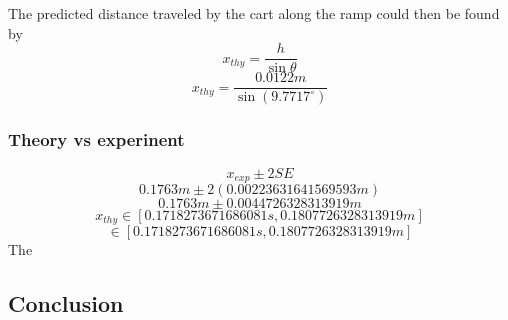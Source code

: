 \documentclass[11pt, letterpaper, includehead]{article}
\begin{document}
The predicted distance traveled by the cart along the ramp could then be
found by 
$$x_{thy} = \frac{h}{\sin \theta}$$
$$x_{thy} = \frac{0.0122m}{\sin(9.7717^{\circ})}$$

\subsubsection{Theory vs experinent}
$$x_{exp} \pm 2SE$$
$$0.1763m \pm 2(0.00223631641569593m)$$
$$0.1763m \pm 0.0044726328313919m$$
$$x_{thy}\in [0.1718273671686081 s, 0.1807726328313919m]$$
$$\in [0.1718273671686081 s, 0.1807726328313919m]$$
The 

\subsection{Conclusion}
\end{document}
